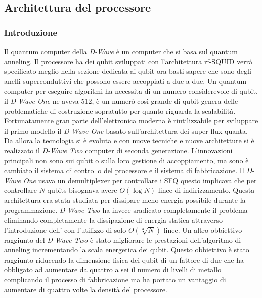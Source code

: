 \subsection{Architettura del processore}
\subsubsection{Introduzione}
Il quantum computer della \textit{D-Wave} è un computer che si basa sul quantum anneling. Il processore ha dei qubit sviluppati con l'architettura rf-SQUID verrà specificato meglio nella sezione dedicata ai qubit ora basti sapere che sono degli anelli superconduttivi che possono essere accoppiati a due a due. Un quantum computer per eseguire algoritmi ha necessita di un numero considerevole di qubit, il \textit{D-Wave One} ne aveva 512, è un numerò così grande di qubit genera delle problematiche di costruzione sopratutto per quanto riguarda la scalabilità. Fortunatamente gran parte dell'elettronica moderna è riutilizzabile per sviluppare il primo modello il \textit{D-Wave One} basato sull'architettura dei  super flux quanta. Da allora la tecnologia si è evoluta e con nuove tecniche e nuove architetture si è realizzato il \textit{D-Wave Two} computer di seconda generazione. L'innovazioni principali non sono sui qubit o sulla loro gestione di accoppiamento, ma sono è cambiato il sistema di controllo del processore e il sistema di fabbricazione. Il \textit{D-Wave One} usava un demultiplexer per controllare i SFQ questo implicava che per controllare $N$ qubits bisognava avere $O(\log{N})$ linee di indirizzamento. Questa architettura era stata studiata per dissipare meno energia possibile durante la programmazione. \textit{D-Wave Two} ha invece sradicato completamente il problema eliminando completamente la dissipazione di energia statica attraverso l'introduzione dell' con l'utilizzo di solo $O(\sqrt[3]{N})$ linee. Un altro obbiettivo raggiunto del \textit{D-Wave Two} è stato migliorare le prestazioni dell'algoritmo di anneling incrementando la scala energetica dei qubit. Questo obbiettivo è stato raggiunto riducendo la dimensione fisica dei qubit di un fattore di due che ha obbligato ad aumentare da quattro a sei il numero di livelli di metallo complicando il processo di fabbricazione ma ha portato un vantaggio di aumentare di quattro volte la densità del processore.

